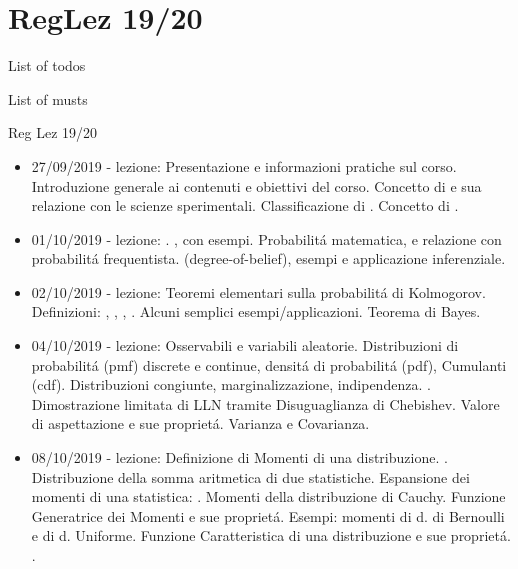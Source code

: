 
\section{RegLez 19/20}

\begin{frame}[allowframebreaks]{List of todos}
\listoftodos
\end{frame}

\begin{frame}[allowframebreaks]{List of musts}
\listofmusts
\end{frame}

\begin{frame}[allowframebreaks]{Reg Lez 19/20}
\begin{itemize}
\item 27/09/2019 - lezione: Presentazione e informazioni pratiche sul corso. Introduzione generale ai contenuti e obiettivi del corso. Concetto di  e sua relazione con le scienze sperimentali. Classificazione di . Concetto di .
\item 01/10/2019 - lezione: . , con esempi. Probabilit\'a matematica,  e relazione con probabilit\'a frequentista.  (degree-of-belief), esempi e applicazione inferenziale.
\item 02/10/2019 - lezione: Teoremi elementari sulla probabilit\'a di Kolmogorov. Definizioni: , , , . Alcuni semplici esempi/applicazioni. Teorema di Bayes.
\item 04/10/2019 - lezione: Osservabili e variabili aleatorie. Distribuzioni di probabilit\'a (pmf) discrete e continue, densit\'a di probabilit\'a (pdf), Cumulanti (cdf). Distribuzioni congiunte, marginalizzazione, indipendenza. . Dimostrazione limitata di LLN tramite Disuguaglianza di Chebishev. Valore di aspettazione e sue propriet\'a. Varianza e Covarianza.
\item 08/10/2019 - lezione: Definizione di Momenti di una distribuzione. . Distribuzione della somma aritmetica di due statistiche. Espansione dei momenti di una statistica: . Momenti della distribuzione di Cauchy. Funzione Generatrice dei Momenti e sue propriet\'a. Esempi: momenti di d. di Bernoulli e di d. Uniforme. Funzione Caratteristica di una distribuzione e sue propriet\'a. .

\end{itemize}
\end{frame}
